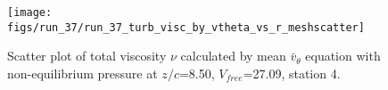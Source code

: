 \begin{figure}[H]
\centering
\texttt{[image: figs/run\_37/run\_37\_turb\_visc\_by\_vtheta\_vs\_r\_meshscatter]}
\caption{Scatter plot of total viscosity $\nu$ calculated by mean $\bar{v}_{\theta}$ equation with non-equilibrium pressure at $z/c$=8.50, $V_{free}$=27.09, station 4.}
\label{fig:run_37_turb_visc_by_vtheta_vs_r_meshscatter}
\end{figure}


